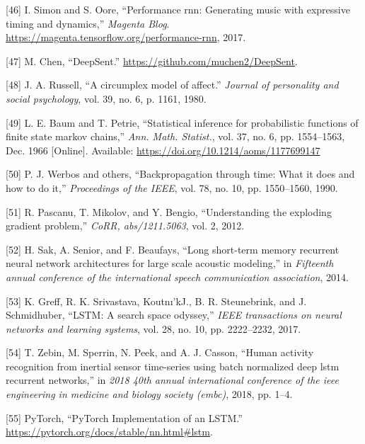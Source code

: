 \documentclass[12pt,]{article}
\begin{document}
\leavevmode\hypertarget{ref-performance-rnn-2017}{}%
{[}46{]} I. Simon and S. Oore, ``Performance rnn: Generating music with
expressive timing and dynamics,'' \emph{Magenta Blog}.
\url{https://magenta.tensorflow.org/performance-rnn}, 2017.

\leavevmode\hypertarget{ref-deepsent}{}%
{[}47{]} M. Chen, ``DeepSent.''
\url{https://github.com/muchen2/DeepSent}.

\leavevmode\hypertarget{ref-russell1980circumplex}{}%
{[}48{]} J. A. Russell, ``A circumplex model of affect.'' \emph{Journal
of personality and social psychology}, vol. 39, no. 6, p. 1161, 1980.

\leavevmode\hypertarget{ref-baum1966}{}%
{[}49{]} L. E. Baum and T. Petrie, ``Statistical inference for
probabilistic functions of finite state markov chains,'' \emph{Ann.
Math. Statist.}, vol. 37, no. 6, pp. 1554--1563, Dec. 1966 {[}Online{]}.
Available: \url{https://doi.org/10.1214/aoms/1177699147}

\leavevmode\hypertarget{ref-werbos1990backpropagation}{}%
{[}50{]} P. J. Werbos and others, ``Backpropagation through time: What
it does and how to do it,'' \emph{Proceedings of the IEEE}, vol. 78, no.
10, pp. 1550--1560, 1990.

\leavevmode\hypertarget{ref-pascanu2012understanding}{}%
{[}51{]} R. Pascanu, T. Mikolov, and Y. Bengio, ``Understanding the
exploding gradient problem,'' \emph{CoRR, abs/1211.5063}, vol. 2, 2012.

\leavevmode\hypertarget{ref-sak2014long}{}%
{[}52{]} H. Sak, A. Senior, and F. Beaufays, ``Long short-term memory
recurrent neural network architectures for large scale acoustic
modeling,'' in \emph{Fifteenth annual conference of the international
speech communication association}, 2014.

\leavevmode\hypertarget{ref-greff2017lstm}{}%
{[}53{]} K. Greff, R. K. Srivastava, Koutnı'kJ., B. R. Steunebrink, and
J. Schmidhuber, ``LSTM: A search space odyssey,'' \emph{IEEE
transactions on neural networks and learning systems}, vol. 28, no. 10,
pp. 2222--2232, 2017.

\leavevmode\hypertarget{ref-zebin2018human}{}%
{[}54{]} T. Zebin, M. Sperrin, N. Peek, and A. J. Casson, ``Human
activity recognition from inertial sensor time-series using batch
normalized deep lstm recurrent networks,'' in \emph{2018 40th annual
international conference of the ieee engineering in medicine and biology
society (embc)}, 2018, pp. 1--4.

\leavevmode\hypertarget{ref-pytorchlstm}{}%
{[}55{]} \relax PyTorch, ``PyTorch Implementation of an LSTM.'' \\
\url{https://pytorch.org/docs/stable/nn.html\#lstm}.
\end{document}
